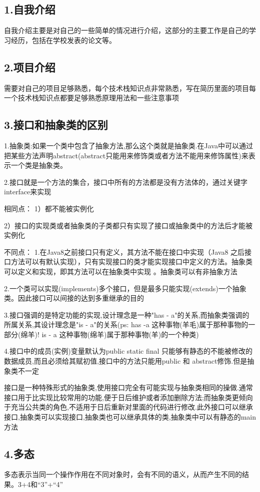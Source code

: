 \documentclass[UTF8]{ctexart}
\begin{document}
\subsection{1.自我介绍}
自我介绍主要是对自己的一些简单的情况进行介绍，这部分的主要工作是自己的学习经历，包括在学校发表的论文等。
\subsection{2.项目介绍}
需要对自己的项目足够熟悉，每个技术栈知识点非常熟悉，写在简历里面的项目每一个技术栈知识点都要足够熟悉原理用法和一些注意事项

\subsection{3.接口和抽象类的区别}
1.抽象类:如果一个类中包含了抽象方法,那么这个类就是抽象类.在Java中可以通过把某些方法声明abstract(abstract只能用来修饰类或者方法不能用来修饰属性)来表示一个类是抽象类。

2.接口就是一个方法的集合，接口中所有的方法都是没有方法体的，通过关键字interface来实现

相同点：
1）都不能被实例化

2）接口的实现类或者抽象类的子类都只有实现了接口或抽象类中的方法后才能被实例化

不同点：
1.在Java8之前接口只有定义，其方法不能在接口中实现（Java8 之后接口方法可以有默认实现），只有实现接口的类才能实现接口中定义的方法。抽象类可以定义和实现，即其方法可以在抽象类中实现 。抽象类可以有非抽象方法

2.一个类可以实现(implements)多个接口，但是最多只能实现(extends)一个抽象类。因此接口可以间接的达到多重继承的目的

3.接口强调的是特定功能的实现,设计理念是一种"has - a"的关系,而抽象类强调的所属关系,其设计理念是"is - a"的关系(ps: has -a 这种事物(羊毛)属于那种事物的一部分(绵羊)! is - a 这种事物(绵羊)属于那种事物(羊)的一个种类)

4.接口中的成员(实例)变量默认为public static final 只能够有静态的不能被修改的数据成员,而且必须给其赋初值,接口中的方法只能用public 和 abstract修饰.但是抽象类不一定

接口是一种特殊形式的抽象类,使用接口完全有可能实现与抽象类相同的操做.通常接口用于比实现比较常用的功能,便于日后维护或者添加删除方法;而抽象类更倾向于充当公共类的角色,不适用于日后重新对里面的代码进行修改.此外接口可以继承接口,抽象类可以实现接口,抽象类也可以继承具体的类,抽象类中可以有静态的main方法

\subsection{4.多态}
多态表示当同一个操作作用在不同对象时，会有不同的语义，从而产生不同的结果。3+4和“3”+“4”
\end{document}
